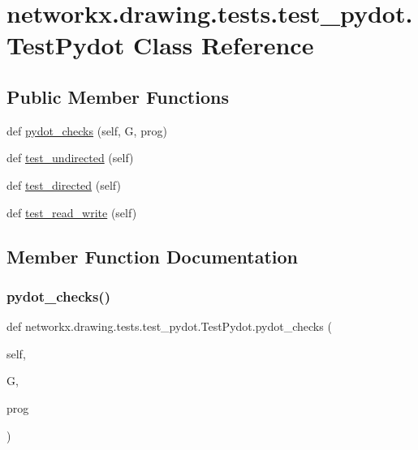 \hypertarget{classnetworkx_1_1drawing_1_1tests_1_1test__pydot_1_1TestPydot}{}\section{networkx.\+drawing.\+tests.\+test\+\_\+pydot.\+Test\+Pydot Class Reference}
\label{classnetworkx_1_1drawing_1_1tests_1_1test__pydot_1_1TestPydot}
\subsection*{Public Member Functions}
\begin{DoxyCompactItemize}
\item 
def \hyperlink{classnetworkx_1_1drawing_1_1tests_1_1test__pydot_1_1TestPydot_a34a5a251285d55de46a579a8b7528452}{pydot\+\_\+checks} (self, G, prog)
\item 
def \hyperlink{classnetworkx_1_1drawing_1_1tests_1_1test__pydot_1_1TestPydot_aad861369d9e9a29e50e7ed6e2d898807}{test\+\_\+undirected} (self)
\item 
def \hyperlink{classnetworkx_1_1drawing_1_1tests_1_1test__pydot_1_1TestPydot_a31574b34fe7dfb63b61713480fe421db}{test\+\_\+directed} (self)
\item 
def \hyperlink{classnetworkx_1_1drawing_1_1tests_1_1test__pydot_1_1TestPydot_a0393cf12dec952ec1c589bbb8b15a8e6}{test\+\_\+read\+\_\+write} (self)
\end{DoxyCompactItemize}


\subsection{Member Function Documentation}
\mbox{\label{classnetworkx_1_1drawing_1_1tests_1_1test__pydot_1_1TestPydot_a34a5a251285d55de46a579a8b7528452}} 
\subsubsection{\texorpdfstring{pydot\+\_\+checks()}{pydot\_checks()}}
{\footnotesize\ttfamily def networkx.\+drawing.\+tests.\+test\+\_\+pydot.\+Test\+Pydot.\+pydot\+\_\+checks (\begin{DoxyParamCaption}\item[{}]{self,  }\item[{}]{G,  }\item[{}]{prog }\end{DoxyParamCaption})}


